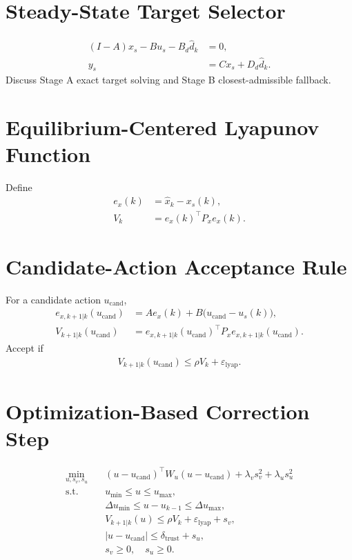\documentclass[11pt]{article}
\begin{document}
\section{Steady-State Target Selector}
\begin{align}
(I - A)x_s - Bu_s - B_d \hat d_k &= 0, \\
y_s &= Cx_s + D_d \hat d_k.
\end{align}
Discuss Stage A exact target solving and Stage B closest-admissible fallback.

\section{Equilibrium-Centered Lyapunov Function}
Define
\begin{align}
e_x(k) &= \hat x_k - x_s(k), \\
V_k &= e_x(k)^\top P_x e_x(k).
\end{align}

\section{Candidate-Action Acceptance Rule}
For a candidate action $u_{\mathrm{cand}}$,
\begin{align}
e_{x, k+1|k}(u_{\mathrm{cand}}) &= A e_x(k) + B\big(u_{\mathrm{cand}} - u_s(k)\big), \\
V_{k+1|k}(u_{\mathrm{cand}}) &= e_{x, k+1|k}(u_{\mathrm{cand}})^\top P_x e_{x, k+1|k}(u_{\mathrm{cand}}).
\end{align}
Accept if
\begin{align}
V_{k+1|k}(u_{\mathrm{cand}}) \le \rho V_k + \varepsilon_{\mathrm{lyap}}.
\end{align}

\section{Optimization-Based Correction Step}
\begin{align}
\min_{u, s_v, s_u} \quad & (u - u_{\mathrm{cand}})^\top W_u (u - u_{\mathrm{cand}}) + \lambda_v s_v^2 + \lambda_u s_u^2 \\
\text{s.t.} \quad & u_{\min} \le u \le u_{\max}, \\
& \Delta u_{\min} \le u - u_{k-1} \le \Delta u_{\max}, \\
& V_{k+1|k}(u) \le \rho V_k + \varepsilon_{\mathrm{lyap}} + s_v, \\
& |u - u_{\mathrm{cand}}| \le \delta_{\mathrm{trust}} + s_u, \\
& s_v \ge 0, \quad s_u \ge 0.
\end{align}
\end{document}
